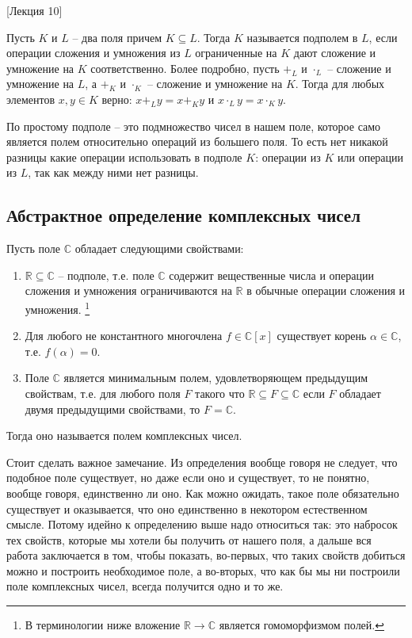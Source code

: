 [Лекция 10]


\begin{definition}
[Подполе]
Пусть $K$ и $L$ -- два поля причем $K \subseteq L$.
Тогда $K$ называется подполем в $L$, если операции сложения и умножения из $L$ ограниченные на $K$ дают сложение и умножение на $K$ соответственно.
Более подробно, пусть $+_L$ и $\cdot_L$ -- сложение и умножение на $L$, а $+_K$ и $\cdot_K$ -- сложение и умножение на $K$.
Тогда для любых элементов $x,y\in K$ верно: $x +_L y = x+_K y$ и $x\cdot_L y = x \cdot_K y$.
\end{definition}

По простому подполе -- это подмножество чисел в нашем поле, которое само является полем относительно операций из большего поля.
То есть нет никакой разницы какие операции использовать в подполе $K$: операции из $K$ или операции из $L$, так как между ними нет разницы.

\subsection{Абстрактное определение комплексных чисел}

\begin{definition}
Пусть поле $\mathbb C$ обладает следующими свойствами:
\begin{enumerate}
\item $\mathbb R\subseteq\mathbb C$ -- подполе, т.е. поле $\mathbb C$ содержит вещественные числа и операции сложения и умножения ограничиваются на $\mathbb R$ в обычные операции сложения и умножения.%
\footnote{В терминологии ниже вложение $\mathbb R\to \mathbb C$ является гомоморфизмом полей.}

\item Для любого не константного многочлена $f\in\mathbb C[x]$ существует корень $\alpha\in \mathbb C$, т.е. $f(\alpha) = 0$.

\item Поле $\mathbb C$ является минимальным полем, удовлетворяющем предыдущим свойствам, т.е. для любого поля $F$ такого что $\mathbb R\subseteq F\subseteq \mathbb C$ если $F$ обладает двумя предыдущими свойствами, то $F = \mathbb C$.
\end{enumerate}
Тогда оно называется полем комплексных чисел.
\end{definition}

Стоит сделать важное замечание.
Из определения вообще говоря не следует, что подобное поле существует, но даже если оно и существует, то не понятно, вообще говоря, единственно ли оно.
Как можно ожидать, такое поле обязательно существует и оказывается, что оно единственно в некотором естественном смысле.
Потому идейно к определению выше надо относиться так: это набросок тех свойств, которые мы хотели бы получить от нашего поля, а дальше вся работа заключается в том, чтобы показать, во-первых, что таких свойств добиться можно и построить необходимое поле, а во-вторых, что как бы мы ни построили поле комплексных чисел, всегда получится одно и то же.

